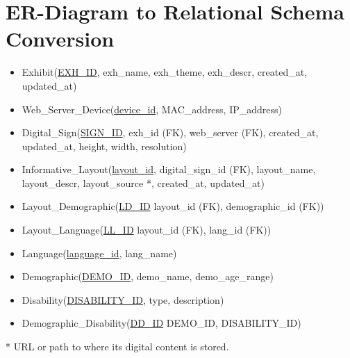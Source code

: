 \documentclass{exam}
\begin{document}
\pagebreak
\section*{ER-Diagram to Relational Schema Conversion}
\bigskip
\begin{itemize}
\item Exhibit(\underline{EXH\_ID}, exh\_name, exh\_theme, exh\_descr, created\_at, updated\_at)

\item Web\_Server\_Device(\underline{device\_id}, MAC\_address, IP\_address)

\item Digital\_Sign(\underline{SIGN\_ID}, exh\_id (FK), web\_server (FK), created\_at, updated\_at, height, width, resolution)

\item Informative\_Layout(\underline{layout\_id}, digital\_sign\_id (FK), layout\_name, layout\_descr, layout\_source *, created\_at, updated\_at)

\item Layout\_Demographic(\underline{LD\_ID} layout\_id (FK), demographic\_id (FK))

\item Layout\_Language(\underline{LL\_ID} layout\_id (FK), lang\_id (FK))

\item Language(\underline{language\_id}, lang\_name)

\item Demographic(\underline{DEMO\_ID}, demo\_name, demo\_age\_range)

\item Disability(\underline{DISABILITY\_ID}, type, description)

\item Demographic\_Disability(\underline{DD\_ID} DEMO\_ID, DISABILITY\_ID)
\end{itemize}
\bigskip
* URL or path to where its digital content is stored.
\end{document}
